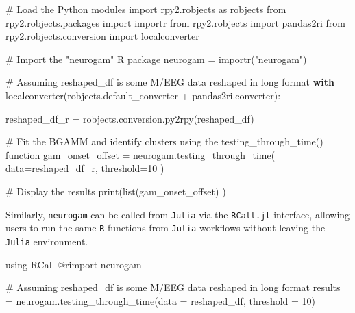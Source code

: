 \documentclass[
  doc,
  floatsintext,
  longtable,
  a4paper,
  nolmodern,
  notxfonts,
  notimes,
  colorlinks=true,linkcolor=blue,citecolor=blue,urlcolor=blue]{apa7}
\newenvironment{Shaded}{\begin{snugshade}}{\end{snugshade}}
\newcommand{\BuiltInTok}[1]{\textcolor[rgb]{0.00,0.23,0.31}{#1}}
\newcommand{\CommentTok}[1]{\textcolor[rgb]{0.37,0.37,0.37}{#1}}
\newcommand{\ControlFlowTok}[1]{\textcolor[rgb]{0.00,0.23,0.31}{\textbf{#1}}}
\newcommand{\DecValTok}[1]{\textcolor[rgb]{0.68,0.00,0.00}{#1}}
\newcommand{\FloatTok}[1]{\textcolor[rgb]{0.68,0.00,0.00}{#1}}
\newcommand{\FunctionTok}[1]{\textcolor[rgb]{0.28,0.35,0.67}{#1}}
\newcommand{\ImportTok}[1]{\textcolor[rgb]{0.00,0.46,0.62}{#1}}
\newcommand{\NormalTok}[1]{\textcolor[rgb]{0.00,0.23,0.31}{#1}}
\newcommand{\OperatorTok}[1]{\textcolor[rgb]{0.37,0.37,0.37}{#1}}
\newcommand{\PreprocessorTok}[1]{\textcolor[rgb]{0.68,0.00,0.00}{#1}}
\newcommand{\StringTok}[1]{\textcolor[rgb]{0.13,0.47,0.30}{#1}}
\begin{document}
\begin{Shaded}
\begin{Highlighting}[]
\CommentTok{\# Load the Python modules}
\ImportTok{import}\NormalTok{ rpy2.robjects }\ImportTok{as}\NormalTok{ robjects}
\ImportTok{from}\NormalTok{ rpy2.robjects.packages }\ImportTok{import}\NormalTok{ importr}
\ImportTok{from}\NormalTok{ rpy2.robjects }\ImportTok{import}\NormalTok{ pandas2ri}
\ImportTok{from}\NormalTok{ rpy2.robjects.conversion }\ImportTok{import}\NormalTok{ localconverter}

\CommentTok{\# Import the "neurogam" R package}
\NormalTok{neurogam }\OperatorTok{=}\NormalTok{ importr(}\StringTok{"neurogam"}\NormalTok{)}

\CommentTok{\# Assuming reshaped\_df is some M/EEG data reshaped in long format}
\ControlFlowTok{with}\NormalTok{ localconverter(robjects.default\_converter }\OperatorTok{+}\NormalTok{ pandas2ri.converter):}
    
\NormalTok{    reshaped\_df\_r }\OperatorTok{=}\NormalTok{ robjects.conversion.py2rpy(reshaped\_df)}
    

\CommentTok{\# Fit the BGAMM and identify clusters using the testing\_through\_time() function}
\NormalTok{gam\_onset\_offset }\OperatorTok{=}\NormalTok{ neurogam.testing\_through\_time(}
\NormalTok{    data}\OperatorTok{=}\NormalTok{reshaped\_df\_r,}
\NormalTok{    threshold}\OperatorTok{=}\DecValTok{10}
\NormalTok{    )}

\CommentTok{\# Display the results}
\BuiltInTok{print}\NormalTok{(}\BuiltInTok{list}\NormalTok{(gam\_onset\_offset) )}
\end{Highlighting}
\end{Shaded}

Similarly, \texttt{neurogam} can be called from \texttt{Julia} via the
\texttt{RCall.jl} interface, allowing users to run the same \texttt{R}
functions from \texttt{Julia} workflows without leaving the
\texttt{Julia} environment.

\begin{Shaded}
\begin{Highlighting}[]
\ImportTok{using} \BuiltInTok{RCall}
\PreprocessorTok{@rimport}\NormalTok{ neurogam}

\CommentTok{\# Assuming reshaped\_df is some M/EEG data reshaped in long format}
\NormalTok{results }\OperatorTok{=}\NormalTok{ neurogam.}\FunctionTok{testing\_through\_time}\NormalTok{(data }\OperatorTok{=}\NormalTok{ reshaped\_df, threshold }\OperatorTok{=} \FloatTok{10}\NormalTok{)}
\end{Highlighting}
\end{Shaded}
\end{document}
